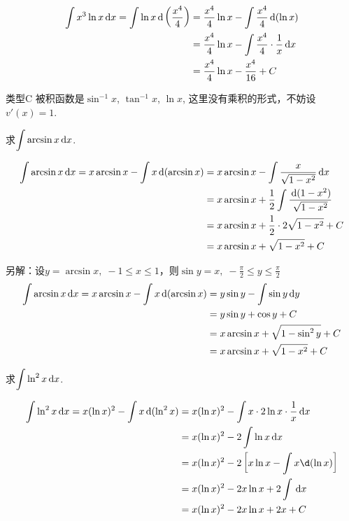 \begin{solution}
\[\begin{split}
    \displaystyle\int x^3\ln x\,{\rm d} x=\int \ln x\,{\rm d}\left(\dfrac{x^4}{4}\right)&=\dfrac{x^4}{4}\ln x-\int \dfrac{x^4}{4}\,{\rm d}(\ln x)\\
    &= \dfrac{x^4}{4}\ln x-\int  \dfrac{x^4}{4}\cdot \dfrac{1}{x}\,{\rm d} x\\
    &= \dfrac{x^4}{4}\ln x- \dfrac{x^4}{16}+C
\end{split}\]
\end{solution}

\begin{blk}
    {类型C} 被积函数是$\sin^{-1}x$, $\tan^{-1}x$, $\ln x$, 这里没有乘积的形式，不妨设$v'(x)=1$.
\end{blk}

\begin{example}
求$\displaystyle\int \arcsin x\,{\rm d} x$.
\end{example}

\begin{solution}
\[\begin{split}
    \displaystyle\int \arcsin x\,{\rm d} x=x\arcsin x-\int x\,{\rm d}(\arcsin x)&=x\arcsin x-\int\dfrac{x}{\sqrt{1-x^2}}\,{\rm d} x  \\
    &=x\arcsin x+\dfrac{1}{2}\int \dfrac{\,{\rm d}(1-x^2)}{\sqrt{1-x^2}}\\
    &=x\arcsin x+\dfrac{1}{2}\cdot 2\sqrt{1-x^2}+C\\
    &=x\arcsin x+\sqrt{1-x^2}+C
\end{split}\]

另解：设$y=\arcsin x,\; -1\le x\le 1$，则$\sin y=x,\; -\frac{\pi}{2}\le y\le \frac{\pi}{2}$
\[\begin{split}
    \displaystyle\int \arcsin x\,{\rm d} x=x\arcsin x-\int x\,{\rm d}(\arcsin x)&=y\sin y-\int \sin y \,{\rm d} y\\
    &=y\sin y+\cos y+C\\
    &=x\arcsin x+\sqrt{1-\sin^2 y}+C\\
    &=x\arcsin x+\sqrt{1-x^2}+C
\end{split}\]
\end{solution}

\begin{example}
    求$\displaystyle\int \ln^2 x\,{\rm d} x$.
\end{example}

\begin{solution}
    \[\begin{split}
        \Int \ln^2 x\dd x=x(\ln x)^2-\int x\dd (\ln^2 x)&=x(\ln x)^2-\int x\cdot 2\ln x\cdot \frac{1}{x}\dd x\\
        &=x(\ln x)^2-2\int \ln x\dd x\\
        &=x(\ln x)^2-2\left[x\ln x-\int x\d(\ln x)\right]\\
        &=x(\ln x)^2-2x\ln x+2\int \dd x\\
        &=x(\ln x)^2-2x\ln x+2x+C   
    \end{split}\]
\end{solution}

